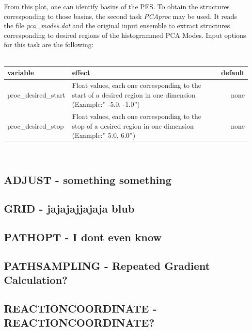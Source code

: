 \documentclass[10pt,a4paper]{article} %
\newif\ifdevmode %
\begin{document}
	From this plot, one can identify basins of the \acl{PES}. To obtain the structures corresponding to those basins, the second task \textit{PCAproc} may be used. It reads the file \textit{pca\_modes.dat} and the original input ensemble to extract structures corresponding to desired regions of the histogrammed \ac{PCA} Modes. Input options for this task are the following:\\~\\
	\begin{tabularx}{\textwidth}{l|X|r}
		variable & effect & default\\
		\hline			
		proc\_desired\_start & Float values, each one corresponding to the start of a desired region in one dimension (Example:'' -5.0, -1.0'') & none\\
		proc\_desired\_stop & Float values, each one corresponding to the stop of a desired region in one dimension (Example:'' 5.0, 6.0'') & none\\
	\end{tabularx}~\\

	\subsection{ADJUST - something something}	
	\ifdevmode \colorbox{red}{write something here} \fi	
	
	\subsection{GRID - jajajajjajaja blub}	
	\ifdevmode \colorbox{red}{write something here} \fi	
	
	\subsection{PATHOPT - I dont even know}	
	\ifdevmode \colorbox{red}{write something here} \fi	
	
	\subsection{PATHSAMPLING - Repeated Gradient Calculation?}	
	\ifdevmode \colorbox{red}{write something here} \fi	

	\subsection{REACTIONCOORDINATE - REACTIONCOORDINATE?}	
	\ifdevmode \colorbox{red}{write something here} \fi	
\end{document}
